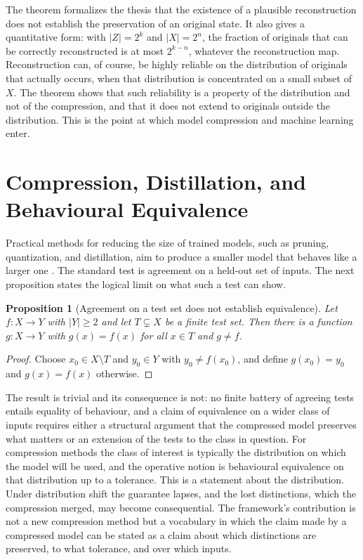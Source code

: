 \documentclass[11pt,twoside,openright]{book}
\theoremstyle{plain}
\newtheorem{proposition}[theorem]{Proposition}
\theoremstyle{definition}
\theoremstyle{remark}
\begin{document}
The theorem formalizes the thesis that the existence of a plausible reconstruction does not establish the preservation of an original state. It also gives a quantitative form: with $|Z|=2^{k}$ and $|X|=2^{n}$, the fraction of originals that can be correctly reconstructed is at most $2^{k-n}$, whatever the reconstruction map. Reconstruction can, of course, be highly reliable on the distribution of originals that actually occurs, when that distribution is concentrated on a small subset of $X$. The theorem shows that such reliability is a property of the distribution and not of the compression, and that it does not extend to originals outside the distribution. This is the point at which model compression and machine learning enter.

\section{Compression, Distillation, and Behavioural Equivalence}

Practical methods for reducing the size of trained models, such as pruning, quantization, and distillation, aim to produce a smaller model that behaves like a larger one \cite{han2016,hinton2015}. The standard test is agreement on a held-out set of inputs. The next proposition states the logical limit on what such a test can show.

\begin{proposition}[Agreement on a test set does not establish equivalence]\label{prop:test}
Let $f:X\to Y$ with $|Y|\ge2$ and let $T\subsetneq X$ be a finite test set. Then there is a function $g:X\to Y$ with $g(x)=f(x)$ for all $x\in T$ and $g\neq f$.
\end{proposition}

\begin{proof}
Choose $x_0\in X\setminus T$ and $y_0\in Y$ with $y_0\neq f(x_0)$, and define $g(x_0)=y_0$ and $g(x)=f(x)$ otherwise.
\end{proof}

The result is trivial and its consequence is not: no finite battery of agreeing tests entails equality of behaviour, and a claim of equivalence on a wider class of inputs requires either a structural argument that the compressed model preserves what matters or an extension of the tests to the class in question. For compression methods the class of interest is typically the distribution on which the model will be used, and the operative notion is behavioural equivalence on that distribution up to a tolerance. This is a statement about the distribution. Under distribution shift the guarantee lapses, and the lost distinctions, which the compression merged, may become consequential. The framework's contribution is not a new compression method but a vocabulary in which the claim made by a compressed model can be stated as a claim about which distinctions are preserved, to what tolerance, and over which inputs.
\end{document}
